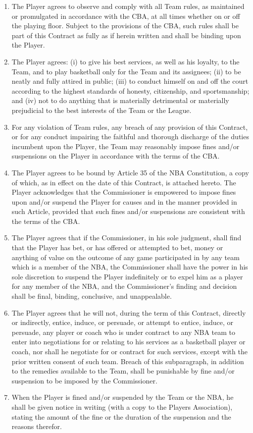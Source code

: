 \documentclass[
]{book}
\providecommand{\tightlist}{%
  \setlength{\itemsep}{0pt}\setlength{\parskip}{0pt}}
\begin{document}
\begin{enumerate}
\def\labelenumi{(\alph{enumi})}
\tightlist
\item
  The Player agrees to observe and comply with all Team rules, as maintained or promulgated in accordance with the CBA, at all times whether on or off the playing floor. Subject to the provisions of the CBA, such rules shall be part of this Contract as fully as if herein written and shall be binding upon the Player.
\item
  The Player agrees: (i) to give his best services, as well as his loyalty, to the Team, and to play basketball only for the Team and its assignees; (ii) to be neatly and fully attired in public; (iii) to conduct himself on and off the court according to the highest standards of honesty, citizenship, and sportsmanship; and (iv) not to do anything that is materially detrimental or materially prejudicial to the best interests of the Team or the League.
\item
  For any violation of Team rules, any breach of any provision of this Contract, or for any conduct impairing the faithful and thorough discharge of the duties incumbent upon the Player, the Team may reasonably impose fines and/or suspensions on the Player in accordance with the terms of the CBA.
\item
  The Player agrees to be bound by Article 35 of the NBA Constitution, a copy of which, as in effect on the date of this Contract, is attached hereto. The Player acknowledges that the Commissioner is empowered to impose fines upon and/or suspend the Player for causes and in the manner provided in such Article, provided that such fines and/or suspensions are consistent with the terms of the CBA.
\item
  The Player agrees that if the Commissioner, in his sole judgment, shall find that the Player has bet, or has offered or attempted to bet, money or anything of value on the outcome of any game participated in by any team which is a member of the NBA, the Commissioner shall have the power in his sole discretion to suspend the Player indefinitely or to expel him as a player for any member of the NBA, and the Commissioner's finding and decision shall be final, binding, conclusive, and unappealable.
\item
  The Player agrees that he will not, during the term of this Contract, directly or indirectly, entice, induce, or persuade, or attempt to entice, induce, or persuade, any player or coach who is under contract to any NBA team to enter into negotiations for or relating to his services as a basketball player or coach, nor shall he negotiate for or contract for such services, except with the prior written consent of such team. Breach of this subparagraph, in addition to the remedies available to the Team, shall be punishable by fine and/or suspension to be imposed by the Commissioner.
\item
  When the Player is fined and/or suspended by the Team or the NBA, he shall be given notice in writing (with a copy to the Players Association), stating the amount of the fine or the duration of the suspension and the reasons therefor.
\end{enumerate}
\end{document}
